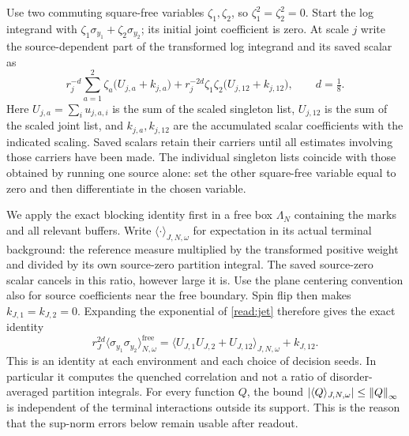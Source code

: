 Use two commuting square-free variables $\zeta_1,\zeta_2$, so
$\zeta_1^2=\zeta_2^2=0$.  Start the log integrand with
$\zeta_1\sigma_{y_1}+\zeta_2\sigma_{y_2}$; its initial joint coefficient
is zero.  At scale $j$ write the source-dependent part of the transformed
log integrand and its saved scalar as
\begin{equation}
 r_j^{-d}\sum_{a=1}^2\zeta_a\bigl(U_{j,a}+k_{j,a}\bigr)
 +r_j^{-2d}\zeta_1\zeta_2\bigl(U_{j,12}+k_{j,12}\bigr),
 \qquad d=\tfrac18.
 \label{read:jet}
\end{equation}
Here $U_{j,a}=\sum_i u_{j,a,i}$ is the sum of the scaled singleton
list, $U_{j,12}$ is the sum of the scaled joint list, and $k_{j,a},k_{j,12}$
are the accumulated scalar coefficients with the indicated scaling.
Saved scalars retain their carriers until all estimates involving those
carriers have been made.  The individual singleton lists coincide with
those obtained by running one source alone: set the other square-free
variable equal to zero and then differentiate in the chosen variable.

We apply the exact blocking identity first in a free box
$\Lambda_N$ containing the marks and all relevant buffers.  Write
$\langle\cdot\rangle_{J,N,\omega}$ for expectation in its actual
terminal background: the reference measure multiplied by the
transformed positive weight and divided by its own source-zero
partition integral.  The saved source-zero scalar cancels in this
ratio, however large it is.  Use the plane centering convention also
for source coefficients near the free boundary.  Spin flip then makes
$k_{J,1}=k_{J,2}=0$.  Expanding the exponential of
\eqref{read:jet} therefore gives the exact identity
\begin{equation}
 r_J^{2d}\langle\sigma_{y_1}\sigma_{y_2}\rangle^{\mathrm{free}}_{N,\omega}
 =\langle U_{J,1}U_{J,2}+U_{J,12}\rangle_{J,N,\omega}+k_{J,12}.
 \label{read:exact-normalized}
\end{equation}
This is an identity at each environment and each choice of decision
seeds.  In particular it computes the quenched correlation and not a
ratio of disorder-averaged partition integrals.  For every function
$Q$, the bound
$|\langle Q\rangle_{J,N,\omega}|\le\left\lVert Q\right\rVert_\infty$ is independent
of the terminal interactions outside its support.  This is the reason
that the sup-norm errors below remain usable after readout.

